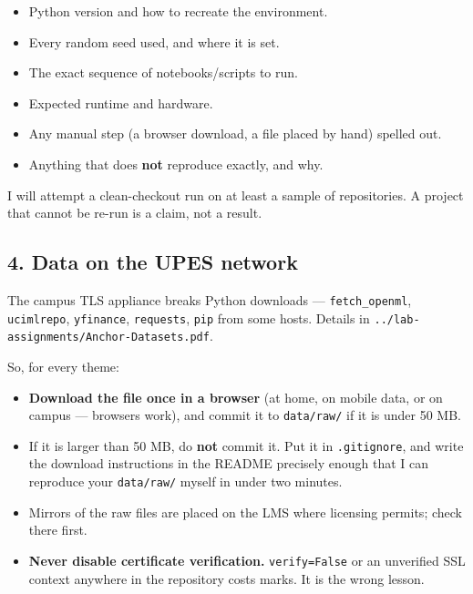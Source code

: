 \documentclass[11pt]{article}
\providecommand{\tightlist}{\setlength{\itemsep}{0pt}\setlength{\parskip}{0pt}}
\begin{document}
\begin{itemize}
\tightlist
\item
  Python version and how to recreate the environment.
\item
  Every random seed used, and where it is set.
\item
  The exact sequence of notebooks/scripts to run.
\item
  Expected runtime and hardware.
\item
  Any manual step (a browser download, a file placed by hand) spelled out.
\item
  Anything that does \textbf{not} reproduce exactly, and why.
\end{itemize}

I will attempt a clean-checkout run on at least a sample of repositories.
A project that cannot be re-run is a claim, not a result.



\hypertarget{data-on-the-upes-network}{%
\subsection{4. Data on the UPES network}\label{data-on-the-upes-network}}

The campus TLS appliance breaks Python downloads --- \texttt{fetch\_openml}, \texttt{ucimlrepo},
\texttt{yfinance}, \texttt{requests}, \texttt{pip} from some hosts. Details in
\texttt{../lab-assignments/Anchor-Datasets.pdf}.

So, for every theme:

\begin{itemize}
\tightlist
\item
  \textbf{Download the file once in a browser} (at home, on mobile data, or on campus ---
  browsers work), and commit it to \texttt{data/raw/} if it is under 50 MB.
\item
  If it is larger than 50 MB, do \textbf{not} commit it. Put it in \texttt{.gitignore},
  and write the download instructions in the README precisely enough that I can
  reproduce your \texttt{data/raw/} myself in under two minutes.
\item
  Mirrors of the raw files are placed on the LMS where licensing permits; check
  there first.
\item
  \textbf{Never disable certificate verification.} \texttt{verify=False} or an unverified SSL
  context anywhere in the repository costs marks. It is the wrong lesson.
\end{itemize}
\end{document}
